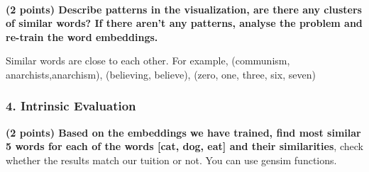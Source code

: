 \documentclass[11pt]{article}
\begin{document}
    \begin{center}
    \end{center}
    { \hspace*{\fill} \\}
    
    \textbf{(2 points) Describe patterns in the visualization, are there any
clusters of similar words? If there aren't any patterns, analyse the
problem and re-train the word embeddings.}

    Similar words are close to each other. For example, (communism,
anarchists,anarchism), (believing, believe), (zero, one, three, six,
seven)

    \hypertarget{intrinsic-evaluation}{%
\subsubsection{4. Intrinsic Evaluation}\label{intrinsic-evaluation}}

\textbf{(2 points) Based on the embeddings we have trained, find most
similar 5 words for each of the words {[}cat, dog, eat{]} and their
similarities}, check whether the results match our tuition or not. You
can use gensim functions.
\end{document}
